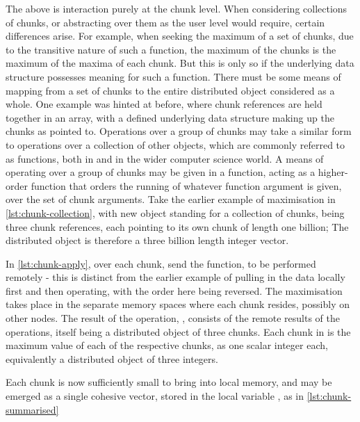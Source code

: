 The above is interaction purely at the chunk level.
When considering collections of chunks, or abstracting over them as the user level would require, certain differences arise.
For example, when seeking the maximum of a set of chunks, due to the transitive nature of such a function, the maximum of the chunks is the maximum of the maxima of each chunk.
But this is only so if the underlying data structure possesses meaning for such a function.
There must be some means of mapping from a set of chunks to the entire distributed object considered as a whole.
One example was hinted at before, where chunk references are held together in an array, with a defined underlying data structure making up the chunks as pointed to.
Operations over a group of chunks may take a similar form to operations over a collection of other objects, which are commonly referred to as  functions, both in \R{} and in the wider computer science world.
A means of operating over a group of chunks may be given in a  function, acting as a higher-order function that orders the running of whatever function argument is given, over the set of chunk arguments.
Take the earlier example of maximisation in \cref{lst:chunk-collection}, with new object  standing for a collection of chunks, being three chunk references, each pointing to its own chunk of length one billion; The distributed object is therefore a three billion length integer vector.


In \cref{lst:chunk-apply}, over each chunk, send the  function, to be performed remotely - this is distinct from the earlier example of pulling in the data locally first and then operating, with the order here being reversed.
The maximisation takes place in the separate memory spaces where each chunk resides, possibly on other nodes.
The result of the operation, , consists of the remote results of the operations, itself being a distributed object of three chunks.
Each chunk in  is the maximum value of each of the respective  chunks, as one scalar integer each, equivalently a distributed object of three integers.


Each chunk is now sufficiently small to bring into local memory, and may be emerged as a single cohesive vector, stored in the local variable , as in \cref{lst:chunk-summarised}

